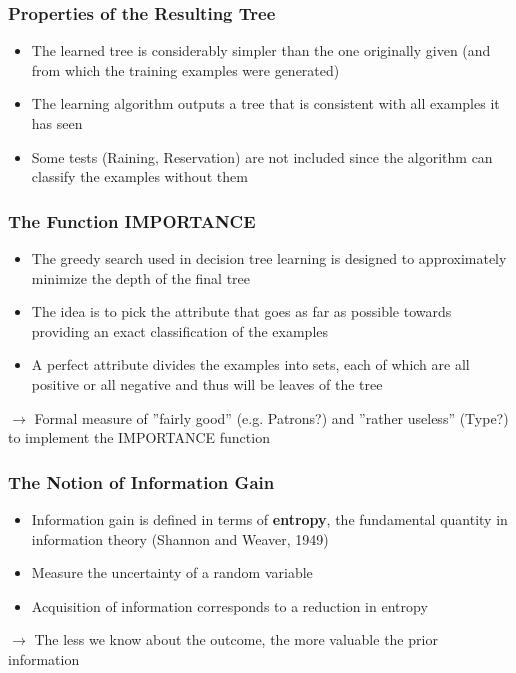 \documentclass[conference, a4paper]{styles/acmsiggraph}
\begin{document}
        \subsubsection{Properties of the Resulting Tree}
            \begin{itemize}
                \item The learned tree is considerably simpler than the one originally given (and from which the training examples were generated)
                \item The learning algorithm outputs a tree that is consistent with all examples it has seen
                \item Some tests (Raining, Reservation) are not included since the algorithm can classify the examples without them
            \end{itemize}
    
    
    
    
    
        \subsubsection{The Function IMPORTANCE}
            \begin{itemize}
                \item The greedy search used in decision tree learning is designed to approximately minimize the depth of the final tree
                \item The idea is to pick the attribute that goes as far as possible towards providing an exact classification of the examples
                \item A perfect attribute divides the examples into sets, each of which are all positive or all negative and thus will be leaves of the tree
            \end{itemize}
            $\rightarrow$ Formal measure of ''fairly good'' (e.g. Patrons?) and ''rather useless'' (Type?) to implement the IMPORTANCE function
        
        \subsubsection{The Notion of Information Gain}
            \begin{itemize}
                \item Information gain is defined in terms of \textbf{entropy}, the fundamental quantity in information theory (Shannon and Weaver, 1949)
                \item Measure the uncertainty of a random variable
                \item Acquisition of information corresponds to a reduction in entropy
            \end{itemize}
            $\rightarrow$ The less we know about the outcome, the more valuable the prior information
        
\end{document}
